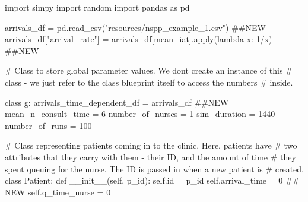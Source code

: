 \documentclass[
  letterpaper,
  DIV=11,
  numbers=noendperiod]{scrreprt}
\newenvironment{Shaded}{}{}
\newcommand{\BuiltInTok}[1]{\textcolor[rgb]{0.84,0.23,0.29}{#1}}
\newcommand{\CommentTok}[1]{\textcolor[rgb]{0.42,0.45,0.49}{#1}}
\newcommand{\DecValTok}[1]{\textcolor[rgb]{0.00,0.36,0.77}{#1}}
\newcommand{\FunctionTok}[1]{\textcolor[rgb]{0.44,0.26,0.76}{#1}}
\newcommand{\ImportTok}[1]{\textcolor[rgb]{0.01,0.18,0.38}{#1}}
\newcommand{\KeywordTok}[1]{\textcolor[rgb]{0.84,0.23,0.29}{#1}}
\newcommand{\NormalTok}[1]{\textcolor[rgb]{0.14,0.16,0.18}{#1}}
\newcommand{\OperatorTok}[1]{\textcolor[rgb]{0.14,0.16,0.18}{#1}}
\newcommand{\StringTok}[1]{\textcolor[rgb]{0.01,0.18,0.38}{#1}}
\newcommand{\VariableTok}[1]{\textcolor[rgb]{0.89,0.38,0.04}{#1}}
\begin{document}
\begin{tcolorbox}[enhanced jigsaw, colframe=quarto-callout-note-color-frame, bottomtitle=1mm, breakable, rightrule=.15mm, coltitle=black, colbacktitle=quarto-callout-note-color!10!white, opacityback=0, leftrule=.75mm, arc=.35mm, toptitle=1mm, title=\textcolor{quarto-callout-note-color}{\faInfo}\hspace{0.5em}{Note}, titlerule=0mm, colback=white, toprule=.15mm, bottomrule=.15mm, left=2mm, opacitybacktitle=0.6]

\begin{Shaded}
\begin{Highlighting}[]
\ImportTok{import}\NormalTok{ simpy}
\ImportTok{import}\NormalTok{ random}
\ImportTok{import}\NormalTok{ pandas }\ImportTok{as}\NormalTok{ pd}

\NormalTok{arrivals\_df }\OperatorTok{=}\NormalTok{ pd.read\_csv(}\StringTok{"resources/nspp\_example\_1.csv"}\NormalTok{) }\CommentTok{\#\#NEW}
\NormalTok{arrivals\_df[}\StringTok{"arrival\_rate"}\NormalTok{] }\OperatorTok{=}\NormalTok{ arrivals\_df[}\StringTok{\textquotesingle{}mean\_iat\textquotesingle{}}\NormalTok{].}\BuiltInTok{apply}\NormalTok{(}\KeywordTok{lambda}\NormalTok{ x: }\DecValTok{1}\OperatorTok{/}\NormalTok{x) }\CommentTok{\#\#NEW}

\CommentTok{\# Class to store global parameter values.  We don\textquotesingle{}t create an instance of this}
\CommentTok{\# class {-} we just refer to the class blueprint itself to access the numbers}
\CommentTok{\# inside.}

\KeywordTok{class}\NormalTok{ g:}
\NormalTok{    arrivals\_time\_dependent\_df }\OperatorTok{=}\NormalTok{ arrivals\_df }\CommentTok{\#\#NEW}
\NormalTok{    mean\_n\_consult\_time }\OperatorTok{=} \DecValTok{6}
\NormalTok{    number\_of\_nurses }\OperatorTok{=} \DecValTok{1}
\NormalTok{    sim\_duration }\OperatorTok{=} \DecValTok{1440}
\NormalTok{    number\_of\_runs }\OperatorTok{=} \DecValTok{100}

\CommentTok{\# Class representing patients coming in to the clinic.  Here, patients have}
\CommentTok{\# two attributes that they carry with them {-} their ID, and the amount of time}
\CommentTok{\# they spent queuing for the nurse.  The ID is passed in when a new patient is}
\CommentTok{\# created.}
\KeywordTok{class}\NormalTok{ Patient:}
    \KeywordTok{def} \FunctionTok{\_\_init\_\_}\NormalTok{(}\VariableTok{self}\NormalTok{, p\_id):}
        \VariableTok{self}\NormalTok{.}\BuiltInTok{id} \OperatorTok{=}\NormalTok{ p\_id}
        \VariableTok{self}\NormalTok{.arrival\_time }\OperatorTok{=} \DecValTok{0} \CommentTok{\#\# NEW}
        \VariableTok{self}\NormalTok{.q\_time\_nurse }\OperatorTok{=} \DecValTok{0}


\end{Highlighting}
\end{Shaded}
\end{tcolorbox}
\end{document}
